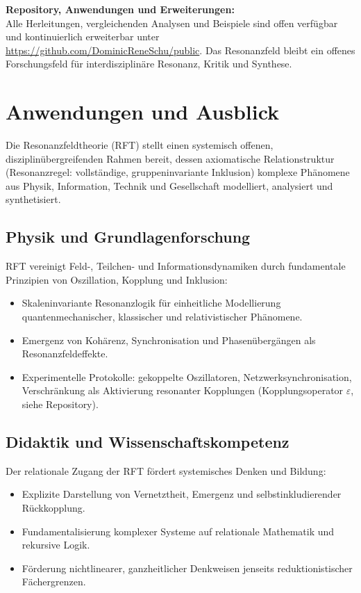 \documentclass[12pt]{iopart}
\begin{document}
\medskip

\noindent\textbf{Repository, Anwendungen und Erweiterungen:}\\
Alle Herleitungen, vergleichenden Analysen und Beispiele sind offen verfügbar und kontinuierlich erweiterbar unter  
\url{https://github.com/DominicReneSchu/public}.  
Das Resonanzfeld bleibt ein offenes Forschungsfeld für interdisziplinäre Resonanz, Kritik und Synthese.

\section{Anwendungen und Ausblick}

Die Resonanzfeldtheorie (RFT) stellt einen systemisch offenen, disziplinübergreifenden Rahmen bereit, dessen axiomatische Relationstruktur (Resonanzregel: vollständige, gruppeninvariante Inklusion) komplexe Phänomene aus Physik, Information, Technik und Gesellschaft modelliert, analysiert und synthetisiert.

\subsection{Physik und Grundlagenforschung}

RFT vereinigt Feld-, Teilchen- und Informationsdynamiken durch fundamentale Prinzipien von Oszillation, Kopplung und Inklusion:
\begin{itemize}
	\item Skaleninvariante Resonanzlogik für einheitliche Modellierung quantenmechanischer, klassischer und relativistischer Phänomene.
	\item Emergenz von Kohärenz, Synchronisation und Phasenübergängen als Resonanzfeldeffekte.
	\item Experimentelle Protokolle: gekoppelte Oszillatoren, Netzwerksynchronisation, Verschränkung als Aktivierung resonanter Kopplungen (Kopplungsoperator $\varepsilon$, siehe Repository).
\end{itemize}

\subsection{Didaktik und Wissenschaftskompetenz}

Der relationale Zugang der RFT fördert systemisches Denken und Bildung:
\begin{itemize}
	\item Explizite Darstellung von Vernetztheit, Emergenz und selbstinkludierender Rückkopplung.
	\item Fundamentalisierung komplexer Systeme auf relationale Mathematik und rekursive Logik.
	\item Förderung nichtlinearer, ganzheitlicher Denkweisen jenseits reduktionistischer Fächergrenzen.
\end{itemize}
\end{document}
